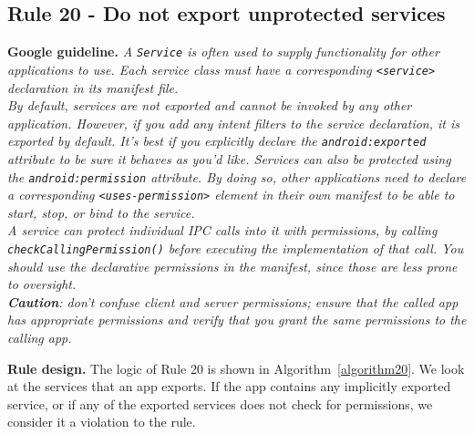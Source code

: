 \subsection{Rule 20 - Do not export unprotected services} 
\textbf{Google guideline.} \emph{A \texttt{Service} is often used to supply functionality for other applications to use. Each service class must have a corresponding \texttt{<service>} declaration in its manifest file.
\\
By default, services are not exported and cannot be invoked by any other application. However, if you add any intent filters to the service declaration, it is exported by default. It's best if you explicitly declare the \texttt{android:exported} attribute to be sure it behaves as you'd like. Services can also be protected using the \texttt{android:permission} attribute. By doing so, other applications need to declare a corresponding \texttt{<uses-permission>} element in their own manifest to be able to start, stop, or bind to the service. 
\\
A service can protect individual IPC calls into it with permissions, by calling \texttt{checkCallingPermission()} before executing the implementation of that call. You should use the declarative permissions in the manifest, since those are less prone to oversight.
\\
\textbf{Caution}: don't confuse client and server permissions; ensure that the called app has appropriate permissions and verify that you grant the same permissions to the calling app.}

\textbf{Rule design.} The logic of Rule 20 is shown in Algorithm~\ref{algorithm20}. We look at the services that an app exports. If the app contains any implicitly exported service, or if any of the exported services does not check for permissions, we consider it a violation to the rule. 

\setcounter{algocf}{19}
\begin{algorithm}[]
\SetAlgoLined
{}
\caption{}
\label{algorithm20}
\end{algorithm}

